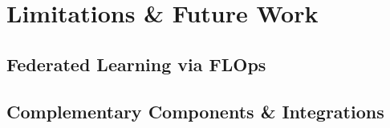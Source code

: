 \section{Limitations \& Future Work}



\subsection{Federated Learning via FLOps}

\subsection{Complementary Components \& Integrations}